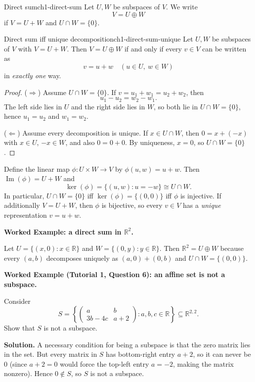 \begin{definition}{Direct sum}{ch1-direct-sum}
Let $U,W$ be subspaces of $V$. We write
\[
V=U\oplus W
\]
if $V=U+W$ and $U\cap W=\{0\}$.
\end{definition}

\begin{theorem}{Direct sum iff unique decomposition}{ch1-direct-sum-unique}
Let $U,W$ be subspaces of $V$ with $V=U+W$.
Then $V=U\oplus W$ if and only if every $v\in V$ can be written as
\[
v=u+w \quad (u\in U,\ w\in W)
\]
in \emph{exactly one} way.
\begin{proof}
($\Rightarrow$) Assume $U\cap W=\{0\}$. If $v=u_1+w_1=u_2+w_2$, then
\[
u_1-u_2=w_2-w_1.
\]
The left side lies in $U$ and the right side lies in $W$, so both lie in $U\cap W=\{0\}$, hence $u_1=u_2$ and $w_1=w_2$.

($\Leftarrow$) Assume every decomposition is unique. If $x\in U\cap W$, then $0=x+(-x)$ with $x\in U$, $-x\in W$, and also $0=0+0$.
By uniqueness, $x=0$, so $U\cap W=\{0\}$.
\end{proof}
\end{theorem}

\begin{policynote}[title={Extension (Lecture Week 2: Direct sums via the sum map)}]
Define the linear map $\phi:U\times W\to V$ by $\phi(u,w)=u+w$.
Then $\operatorname{Im}(\phi)=U+W$ and
\[
\ker(\phi)=\{(u,w):u=-w\} \cong U\cap W.
\]
In particular, $U\cap W=\{0\}$ iff $\ker(\phi)=\{(0,0)\}$ iff $\phi$ is injective.
If additionally $V=U+W$, then $\phi$ is bijective, so every $v\in V$ has a \emph{unique} representation $v=u+w$.
\end{policynote}

\begin{examplebox}
\textbf{Worked Example: a direct sum in $\mathbb{R}^2$.}

Let $U=\{(x,0):x\in\mathbb{R}\}$ and $W=\{(0,y):y\in\mathbb{R}\}$.
Then $\mathbb{R}^2=U\oplus W$ because every $(a,b)$ decomposes uniquely as $(a,0)+(0,b)$ and $U\cap W=\{(0,0)\}$.
\end{examplebox}

\begin{examplebox}
\textbf{Worked Example (Tutorial 1, Question 6): an affine set is not a subspace.}

Consider
\[
S=\left\{\begin{pmatrix}a&b\\3b-4c&a+2\end{pmatrix}:a,b,c\in\mathbb{R}\right\}\subseteq \mathbb{R}^{2,2}.
\]
Show that $S$ is not a subspace.

\medskip
\textbf{Solution.}
A necessary condition for being a subspace is that the zero matrix lies in the set.
But every matrix in $S$ has bottom-right entry $a+2$, so it can never be $0$ (since $a+2=0$ would force the top-left entry $a=-2$, making the matrix nonzero).
Hence $0\notin S$, so $S$ is not a subspace.
\end{examplebox}

